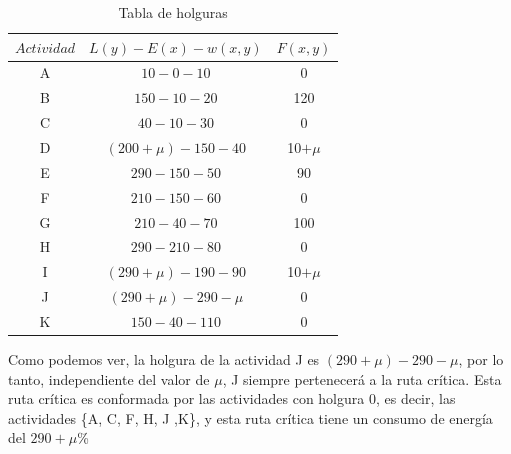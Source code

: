 \documentclass[letterpaper,10pt]{article}
\begin{document}
\begin{enumerate}
        \begin{table}[H]
            \centering
        \begin{tabular}{|c|c|c|}\hline
            $ Actividad  $ & $L(y) - E(x) - w(x, y)$ & $F(x, y)$  \\ \hline
             A & $10 - 0 - 10$ & 0      \\\hline
             B & $150 - 10 - 20$ & 120   \\\hline
             C & $40 - 10 - 30$ & 0      \\\hline
             D & $(200 + \mu) - 150 - 40$ & 10$+\mu$   \\\hline
             E & $290-150-50$ & 90      \\\hline
             F & $210-150-60$ & 0   \\\hline
             G & $210-40-70$ & 100      \\\hline
             H & $290-210-80$ & 0   \\\hline
             I & $(290+\mu)-190-90$ & 10$+\mu$     \\\hline
             J & $(290+\mu)-290-\mu$ & 0   \\\hline
             K & $150-40-110$ & 0      \\\hline
            \end{tabular}
            \caption{Tabla de holguras}
            \label{tablitaholgura}
        \end{table}

        Como podemos ver, la holgura de la actividad J es $(290+\mu)-290-\mu$, por lo tanto, independiente del 
        valor de $\mu$, J siempre pertenecerá a la ruta crítica. Esta ruta crítica es conformada por las actividades 
        con holgura 0, es decir, las actividades \{A, C, F, H, J ,K\}, y esta ruta crítica tiene un consumo de energía del $290 + \mu $\%
        \newline
        \newline
        

\end{enumerate}
\end{document}
